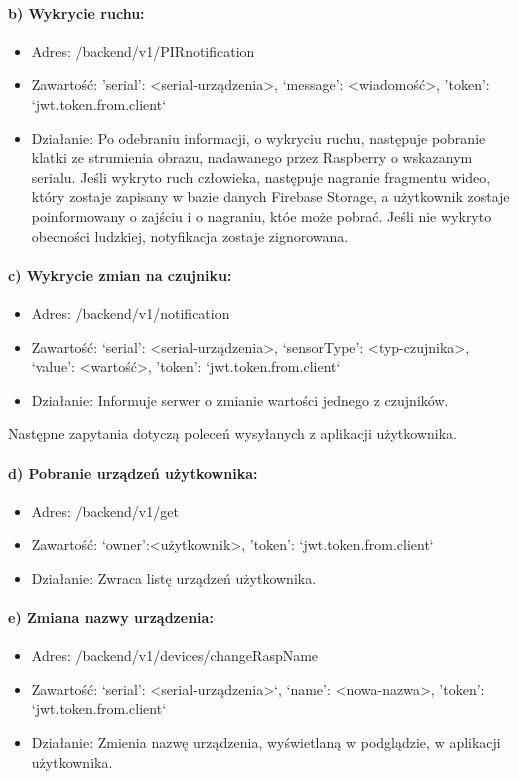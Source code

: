 \paragraph{b) Wykrycie ruchu:}
\begin{itemize}
\item Adres: /backend/v1/PIRnotification
\item Zawartość: {'serial': <serial-urządzenia>, ‘message’: <wiadomość>, 'token': `jwt.token.from.client`}
\item Działanie: Po odebraniu informacji, o wykryciu ruchu, następuje pobranie klatki ze strumienia obrazu, nadawanego przez Raspberry o wskazanym serialu. Jeśli wykryto ruch człowieka, następuje nagranie fragmentu wideo, który zostaje zapisany w bazie danych Firebase Storage, a użytkownik zostaje poinformowany o zajściu i o nagraniu, któe może pobrać. Jeśli nie wykryto obecności ludzkiej, notyfikacja zostaje zignorowana.
\end{itemize}
\paragraph{c) Wykrycie zmian na czujniku:}
\begin{itemize}
\item Adres: /backend/v1/notification
\item Zawartość: {‘serial’: <serial-urządzenia>, ‘sensorType’: <typ-czujnika>, 
‘value’: <wartość>, 'token': `jwt.token.from.client`}
\item Działanie: Informuje serwer o zmianie wartości jednego z czujników.
\end{itemize}
Następne zapytania dotyczą poleceń wysyłanych z aplikacji użytkownika.
\paragraph{d) Pobranie urządzeń użytkownika:}
\begin{itemize}
\item Adres: /backend/v1/get
\item Zawartość: {‘owner’:<użytkownik>, 'token': `jwt.token.from.client`}
\item Działanie: Zwraca listę urządzeń użytkownika.
\end{itemize}
\paragraph{e) Zmiana nazwy urządzenia:}
\begin{itemize}
\item Adres: /backend/v1/devices/changeRaspName
\item Zawartość: {‘serial’: <serial-urządzenia>‘, ‘name’: <nowa-nazwa>, 
'token': `jwt.token.from.client`}
\item Działanie: Zmienia nazwę urządzenia, wyświetlaną w podglądzie, w aplikacji użytkownika.
\end{itemize}

